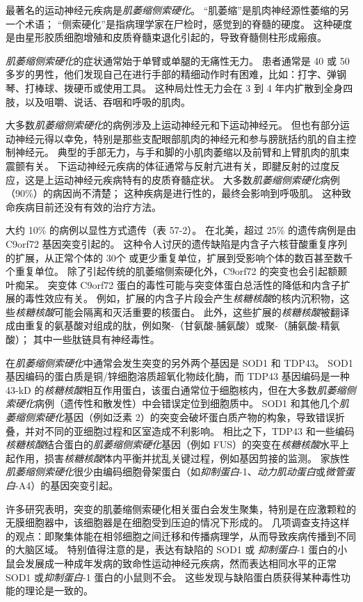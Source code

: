 最著名的运动神经元疾病是\textit{肌萎缩侧索硬化}。
“肌萎缩”是肌肉神经源性萎缩的另一个术语；
“侧索硬化”是指病理学家在尸检时，感觉到的脊髓的硬度。
这种硬度是由星形胶质细胞增殖和皮质脊髓束退化引起的，导致脊髓侧柱形成瘢痕。


\textit{肌萎缩侧索硬化}的症状通常始于单臂或单腿的无痛性无力。
患者通常是 40 或 50 多岁的男性，他们发现自己在进行手部的精细动作时有困难，比如：打字、弹钢琴、打棒球、拨硬币或使用工具。
这种局灶性无力会在 3 到 4 年内扩散到全身四肢，以及咀嚼、说话、吞咽和呼吸的肌肉。


大多数\textit{肌萎缩侧索硬化}的病例涉及上运动神经元和下运动神经元。
但也有部分运动神经元得以幸免，特别是那些支配眼部肌肉的神经元和参与膀胱括约肌的自主控制神经元。
典型的手部无力，与手和脚的小肌肉萎缩以及前臂和上臂肌肉的肌束震颤有关。
下运动神经元疾病的体征通常与反射亢进有关，即腱反射的过度反应，这是上运动神经元疾病特有的皮质脊髓症状。
大多数\textit{肌萎缩侧索硬化}病例（90\%）的病因尚不清楚；
这种疾病是进行性的，最终会影响到呼吸肌。
这种致命疾病目前还没有有效的治疗方法。


大约 10\% 的病例以显性方式遗传（表 57-2）。
在北美，超过 25\% 的遗传病例是由 C9orf72 基因突变引起的。
这种令人讨厌的遗传缺陷是内含子六核苷酸重复序列的扩展，从正常个体的 30个 或更少重复单位，扩展到受影响个体的数百甚至数千个重复单位。
除了引起传统的肌萎缩侧索硬化外，C9orf72 的突变也会引起额颞叶痴呆。
突变体 C9orf72 蛋白的毒性可能与突变体蛋白总活性的降低和内含子扩展的毒性效应有关。
例如，扩展的内含子片段会产生\textit{核糖核酸}的核内沉积物，这些\textit{核糖核酸}可能会隔离和灭活重要的核蛋白。
此外，这些扩展的\textit{核糖核酸}被翻译成由重复的氨基酸对组成的肽，例如聚-（甘氨酸-脯氨酸）或聚-（脯氨酸-精氨酸）；
其中一些肽链具有神经毒性。


在\textit{肌萎缩侧索硬化}中通常会发生突变的另外两个基因是 SOD1 和 TDP43。
SOD1 基因编码的蛋白质是铜/锌细胞溶质超氧化物歧化酶，而 TDP43 基因编码是一种 43-kD 的\textit{核糖核酸}相互作用蛋白，该蛋白通常位于细胞核内，但在大多数\textit{肌萎缩侧索硬化}病例（遗传性和散发性）中会错误定位到细胞质中。
SOD1 和其他几个\textit{肌萎缩侧索硬化}基因（例如泛素 2）的突变会破坏蛋白质产物的构象，导致错误折叠，并对不同的亚细胞过程和区室造成不利影响。
相比之下，TDP43 和一些编码\textit{核糖核酸}结合蛋白的\textit{肌萎缩侧索硬化}基因（例如 FUS）的突变在\textit{核糖核酸}水平上起作用，损害\textit{核糖核酸}体内平衡并扰乱关键过程，例如基因剪接的监测。
家族性\textit{肌萎缩侧索硬化}很少由编码细胞骨架蛋白（如\textit{抑制蛋白}-1、\textit{动力肌动蛋白}或\textit{微管蛋白}-A4）的基因突变引起。


许多研究表明，突变的肌萎缩侧索硬化相关蛋白会发生聚集，特别是在应激颗粒的无膜细胞器中，该细胞器是在细胞受到压迫的情况下形成的。
几项调查支持这样的观点：即聚集体能在相邻细胞之间迁移和传播病理学，从而导致疾病传播到不同的大脑区域。
特别值得注意的是，表达有缺陷的 SOD1 或 \textit{抑制蛋白}-1 蛋白的小鼠会发展成一种成年发病的致命性运动神经元疾病，然而表达相同水平的正常 SOD1 或\textit{抑制蛋白}-1 蛋白的小鼠则不会。
这些发现与缺陷蛋白质获得某种毒性功能的理论是一致的。


